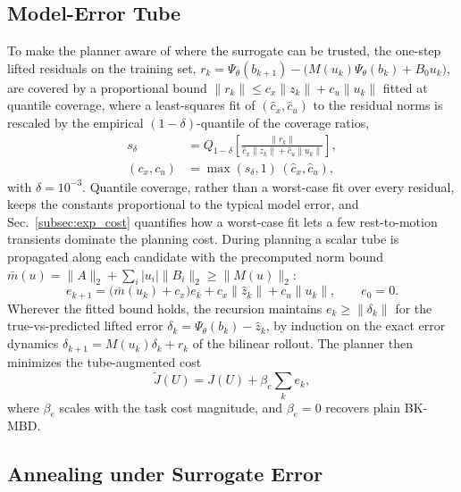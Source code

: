 \documentclass[letterpaper,10pt,conference]{ieeeconf}
\newcommand{\bkmbd}{\textsc{BK-MBD}}
\begin{document}
\subsection{Model-Error Tube}\label{subsec:tube}

To make the planner aware of where the surrogate can be trusted, the one-step lifted residuals on the training set, $r_k = \Psi_\theta(b_{k+1}) - \big(M(u_k)\Psi_\theta(b_k) + B_0 u_k\big)$, are covered by a proportional bound $\|r_k\| \le c_x \|z_k\| + c_u \|u_k\|$ fitted at quantile coverage, where a least-squares fit of $(\hat c_x, \hat c_u)$ to the residual norms is rescaled by the empirical $(1-\delta)$-quantile of the coverage ratios,
\begin{equation}
\begin{aligned}
s_\delta &= Q_{1-\delta}\!\left[
\frac{\|r_k\|}{\hat c_x \|z_k\| + \hat c_u \|u_k\|}
\right], \\
(c_x, c_u) &= \max(s_\delta, 1) \,(\hat c_x, \hat c_u),
\end{aligned}
\label{eq:tubefit}
\end{equation}
with $\delta = 10^{-3}$.
Quantile coverage, rather than a worst-case fit over every residual, keeps the constants proportional to the typical model error, and Sec.~\ref{subsec:exp_cost} quantifies how a worst-case fit lets a few rest-to-motion transients dominate the planning cost.
During planning a scalar tube is propagated along each candidate with the precomputed norm bound $\bar m(u) = \|A\|_2 + \sum_i |u_i| \|B_i\|_2 \ge \|M(u)\|_2$:
\begin{equation}
e_{k+1} = \big(\bar m(u_k) + c_x\big) e_k
+ c_x \|\hat z_k\| + c_u \|u_k\|,
\qquad e_0 = 0 .
\label{eq:tube}
\end{equation}
Wherever the fitted bound holds, the recursion maintains $e_k \ge \|\delta_k\|$ for the true-vs-predicted lifted error $\delta_k = \Psi_\theta(b_k) - \hat z_k$, by induction on the exact error dynamics $\delta_{k+1} = M(u_k)\delta_k + r_k$ of the bilinear rollout.
The planner then minimizes the tube-augmented cost
\begin{equation}
\tilde J(U) = J(U) + \beta_e \sum_{k} e_k ,
\label{eq:tubecost}
\end{equation}
where $\beta_e$ scales with the task cost magnitude, and $\beta_e = 0$ recovers plain \bkmbd{}.

\subsection{Annealing under Surrogate Error}\label{subsec:anneal_theory}
\end{document}
